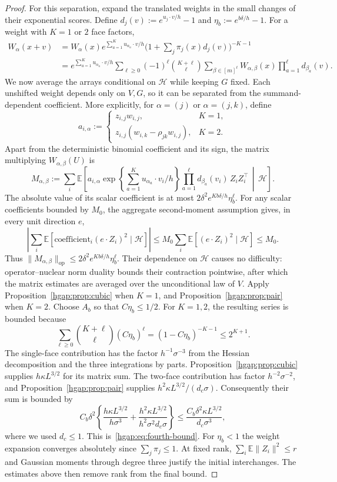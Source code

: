 \documentclass[11pt,letterpaper]{article}
\theoremstyle{remark}
\newcommand{\E}{\mathbb E}
\newcommand{\op}{\mathrm{op}}
\begin{document}
\begin{proof}
For this separation, expand the translated weights in the small
changes of their exponential scores. Define
$d_j(v):=e^{u_j\cdot v/h}-1$ and
$\eta_b:=e^{b\delta/h}-1$. For a weight with $K=1$ or $2$ face factors,
\begin{align*}
 W_\alpha(x+v)
 &=W_\alpha(x)e^{\sum_{a=1}^K u_{\alpha_a}\cdot v/h}
     \bigl(1+\sum_j\pi_j(x)d_j(v)\bigr)^{-K-1}\\
 &=e^{\sum_{a=1}^K u_{\alpha_a}\cdot v/h}
   \sum_{\ell\ge0}(-1)^\ell\binom{K+\ell}{\ell}
   \sum_{\beta\in[m]^\ell}W_{\alpha,\beta}(x)
                       \prod_{a=1}^\ell d_{\beta_a}(v).
\end{align*}
We now average the arrays conditional on $\mathcal H$ while keeping
$G$ fixed. Each unshifted weight depends only on $V,G$, so it can be
separated from the summand-dependent coefficient. More explicitly,
for $\alpha=(j)$ or $\alpha=(j,k)$, define
\[
 a_{i,\alpha}:=
 \begin{cases}
 z_{i,j}w_{i,j},&K=1,\\
 z_{i,j}(w_{i,k}-\rho_{jk}w_{i,j}),&K=2.
 \end{cases}
\]
Apart from the deterministic binomial coefficient and its sign, the
matrix multiplying $W_{\alpha,\beta}(U)$ is
\[
 M_{\alpha,\beta}:=\sum_i\E\left[
 a_{i,\alpha}\exp\!\left\{\sum_{a=1}^K u_{\alpha_a}\cdot v_i/h\right\}
 \prod_{a=1}^\ell d_{\beta_a}(v_i)\,Z_iZ_i^\top
 \,\middle|\,\mathcal H\right].
\]
The absolute value of its scalar coefficient is at most
$2\delta^2e^{Kb\delta/h}\eta_b^\ell$.
For any scalar coefficients bounded by $M_0$, the aggregate
second-moment assumption gives, in every unit direction $e$,
\[
 \left|\sum_i\E[\text{coefficient}_i(e\cdot Z_i)^2
                       \mid\mathcal H]\right|
 \le M_0\sum_i\E[(e\cdot Z_i)^2\mid\mathcal H]\le M_0.
\]
Thus $\|M_{\alpha,\beta}\|_{\op}\le
2\delta^2e^{Kb\delta/h}\eta_b^\ell$.
Their dependence on $\mathcal H$ causes no difficulty: operator--nuclear
norm duality bounds their contraction pointwise, after which the matrix
estimates are averaged over the unconditional law of $V$.
Apply Proposition~\ref{hgap:prop:cubic} when $K=1$, and
Proposition~\ref{hgap:prop:pair} when $K=2$.
Choose $A_b$ so that $C\eta_b\le1/2$.
For $K=1,2$, the resulting series is bounded because
\[
 \sum_{\ell\ge0}\binom{K+\ell}{\ell}(C\eta_b)^\ell
       =(1-C\eta_b)^{-K-1}\le2^{K+1}.
\]
The single-face contribution has the factor $h^{-1}\sigma^{-3}$
from the Hessian decomposition and the three integrations by parts.
Proposition~\ref{hgap:prop:cubic} supplies $h\kappa L^{3/2}$ for its matrix sum.
The two-face contribution has factor $h^{-2}\sigma^{-2}$, and
Proposition~\ref{hgap:prop:pair} supplies $h^2\kappa L^{3/2}/(d_c\sigma)$.
Consequently their sum is bounded by
\[
 C_b\delta^2\left\{\frac{h\kappa L^{3/2}}{h\sigma^3}
             +\frac{h^2\kappa L^{3/2}}{h^2\sigma^2d_c\sigma}\right\}
 \le\frac{C_b\delta^2\kappa L^{3/2}}{d_c\sigma^3},
\]
where we used $d_c\le1$. This is~\eqref{hgap:eq:fourth-bound}.
For $\eta_b<1$ the weight expansion converges absolutely since
$\sum_j\pi_j\le1$. At fixed rank, $\sum_i\E\|Z_i\|^2\le r$ and
Gaussian moments through degree three justify the initial interchanges.
The estimates above then remove rank from the final bound.
\end{proof}
\end{document}
